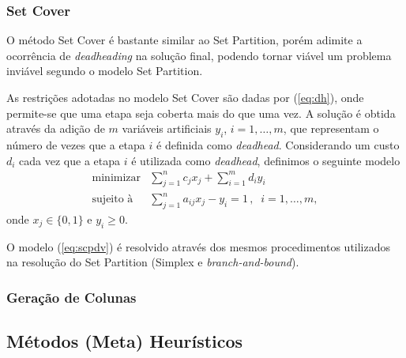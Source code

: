 \documentclass[12pt,a4paper]{article}
\begin{document}

\subsubsection{Set Cover}
\label{sec:metodos_cover}

O método Set Cover é bastante similar ao Set Partition, porém adimite a ocorrência de 
{\it deadheading} na solução final, podendo tornar viável um problema inviável segundo o modelo 
Set Partition.

As restrições adotadas no modelo Set Cover são dadas por (\ref{eq:dh}), onde permite-se que uma 
etapa seja coberta mais do que uma vez. A solução é obtida através da adição de $m$ variáveis 
artificiais $y_i$, $i = 1, \ldots, m$, que representam o número de vezes que a etapa $i$ é 
definida como {\it deadhead}. Considerando um custo $d_i$ cada vez que a etapa $i$ é utilizada
como {\it deadhead}, definimos o seguinte modelo
%
\begin{equation} \label{eq:scpdv}
	\begin{array}{rl}
		\text{minimizar} & \displaystyle \sum_{j=1}^n c_j x_j + \sum_{i=1}^m d_i y_i \\
		\text{sujeito à} & \displaystyle \sum_{j=1}^n a_{ij} x_j - y_i = 1 \, , \;\; i = 1, \ldots, m ,
	\end{array}
\end{equation}
%
onde $x_j \in \{0, 1\}$ e $y_i \geq 0$.

O modelo (\ref{eq:scpdv}) é resolvido através dos mesmos procedimentos utilizados na resolução do
Set Partition (Simplex e {\it branch-and-bound}). 



\subsubsection{Geração de Colunas}
\label{sec:metodos_colunas}


\subsection{Métodos (Meta) Heurísticos}
\label{sec:metodos_heuristicas}
\end{document}
